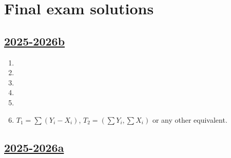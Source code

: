 
\newpage
\thispagestyle{empty}
\section{Final exam solutions}


\subsection[2025-2026b]{\hyperref[sec:kr_04_2025_2026b]{2025-2026b}}
\label{sec:sol_kr_04_2025_2026b} %

\begin{enumerate}
    \item 
    \item 
    \item 
    \item 
    \item 
    \item $T_1 = \sum (Y_i - X_i)$, $T_2 = (\sum Y_i, \sum X_i)$ or any other equivalent. 
\end{enumerate}


\subsection[2025-2026a]{\hyperref[sec:kr_04_2025_2026a]{2025-2026a}}
\label{sec:sol_kr_04_2025_2026a} %

